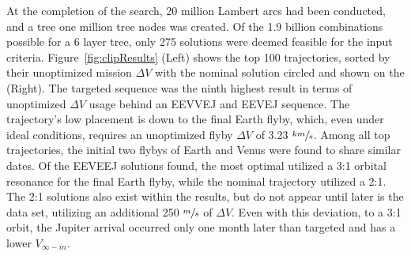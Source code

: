 \documentclass[letterpaper, preprint, paper,11pt]{AAS}	%
\begin{document}
At the completion of the search, 20 million Lambert arcs had been conducted, and a tree one million tree nodes was created. Of the 1.9 billion combinations possible for a 6 layer tree, only 275 solutions were deemed feasible for the input criteria. Figure~\ref*{fig:clipResults} (Left) shows the top 100 trajectories, sorted by their unoptimized mission $\Delta V$ with the nominal solution circled and shown on the (Right). The targeted sequence was the ninth highest result in terms of unoptimized $\Delta V$ usage behind an EEVVEJ and EEVEJ sequence. The trajectory's low placement is down to the final Earth flyby, which, even under ideal conditions, requires an unoptimized flyby $\Delta V$ of 3.23 $\sfrac{km}{s}$. Among all top trajectories, the initial two flybys of Earth and Venus were found to share similar dates. Of the EEVEEJ solutions found, the most optimal utilized a 3:1 orbital resonance for the final Earth flyby, while the nominal trajectory utilized a 2:1. The 2:1 solutions also exist within the results, but do not appear until later is the data set, utilizing an additional 250 $\sfrac{m}{s}$ of $\Delta V$. Even with this deviation, to a 3:1 orbit, the Jupiter arrival occurred only one month later than targeted and has a lower $V_{\infty-in}$.
\end{document}
